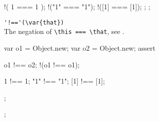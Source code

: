 \begin{urbiscriptapi}
\begin{urbiscript}
{{    !( 1  ===  1 );
    !("1" === "1");
    !([1] === [1]);
  };
};
\end{urbiscript}

\item \lstinline|'!=='(\var{that})|\\%
  The negation of \lstinline|\this === \that|, see .
\begin{urbiscript}
{
  var o1 = Object.new;
  var o2 = Object.new;
  assert
  {
      o1 !== o2;
    !(o1 !== o1);

      1  !==  1;
     "1" !== "1";
     [1] !== [1];
  };
};
\end{urbiscript}

\end{urbiscriptapi}

